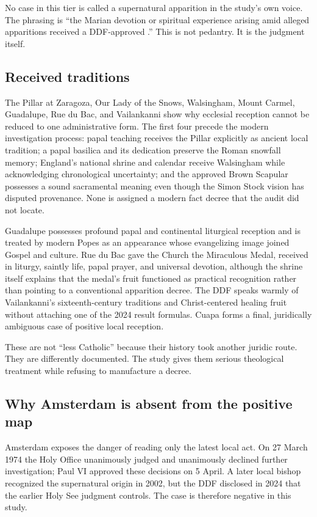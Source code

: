 No case in this tier is called a supernatural apparition in the study's own voice. The phrasing is ``the Marian devotion or spiritual experience arising amid alleged apparitions received a DDF-approved .'' This is not pedantry. It is the judgment itself.

\subsection{Received traditions}

The Pillar at Zaragoza, Our Lady of the Snows, Walsingham, Mount Carmel, Guadalupe, Rue du Bac, and Vailankanni show why ecclesial reception cannot be reduced to one administrative form. The first four precede the modern investigation process: papal teaching receives the Pillar explicitly as ancient local tradition; a papal basilica and its dedication preserve the Roman snowfall memory; England's national shrine and calendar receive Walsingham while acknowledging chronological uncertainty; and the approved Brown Scapular possesses a sound sacramental meaning even though the Simon Stock vision has disputed provenance. None is assigned a modern fact decree that the audit did not locate.

Guadalupe possesses profound papal and continental liturgical reception and is treated by modern Popes as an appearance whose evangelizing image joined Gospel and culture. Rue du Bac gave the Church the Miraculous Medal, received in liturgy, saintly life, papal prayer, and universal devotion, although the shrine itself explains that the medal's fruit functioned as practical recognition rather than pointing to a conventional apparition decree. The DDF speaks warmly of Vailankanni's sixteenth-century traditions and Christ-centered healing fruit without attaching one of the 2024 result formulas. Cuapa forms a final, juridically ambiguous case of positive local reception.

These are not ``less Catholic'' because their history took another juridic route. They are differently documented. The study gives them serious theological treatment while refusing to manufacture a decree.

\subsection{Why Amsterdam is absent from the positive map}

Amsterdam exposes the danger of reading only the latest local act. On 27 March 1974 the Holy Office unanimously judged  and unanimously declined further investigation; Paul VI approved these decisions on 5 April. A later local bishop recognized the supernatural origin in 2002, but the DDF disclosed in 2024 that the earlier Holy See judgment controls. The case is therefore negative in this study.

